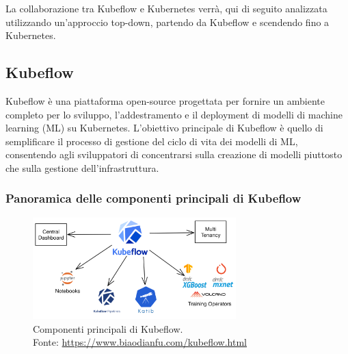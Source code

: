 La collaborazione tra Kubeflow e Kubernetes verrà, qui di seguito  analizzata utilizzando
un'approccio top-down, partendo da Kubeflow e scendendo fino a Kubernetes.\\


\subsection{Kubeflow}
Kubeflow è una piattaforma open-source progettata per fornire un ambiente completo
per lo sviluppo, l'addestramento e il deployment di modelli di machine learning (ML)
su Kubernetes. L'obiettivo principale di Kubeflow è quello di semplificare il processo
di gestione del ciclo di vita dei modelli di ML, consentendo agli sviluppatori
di concentrarsi sulla creazione di modelli piuttosto che sulla gestione dell'infrastruttura.\\


\clearpage
\subsubsection{Panoramica delle componenti principali di Kubeflow}
\begin{figure}[H]
   \centering
   \includegraphics[width=0.7\textwidth]{images/kubeflow-components.png}
       \caption{Componenti principali di Kubeflow.\\
       Fonte: \url{https://www.biaodianfu.com/kubeflow.html}}
   \label{fig:kubeflow-components}
\end{figure}


